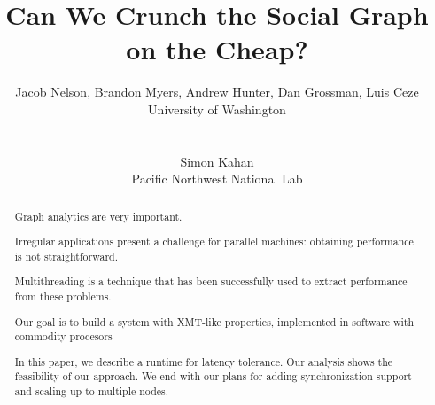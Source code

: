 \documentclass{acm_proc_article-sp}
\begin{document}
\title{Can We Crunch the Social Graph on the Cheap?}

\author{
Jacob Nelson, Brandon Myers, Andrew Hunter, Dan Grossman, Luis Ceze\\
University of Washington\\
\\ \\
Simon Kahan \\ 
Pacific Northwest National Lab\\
}

\maketitle
\begin{abstract}


Graph analytics are very important. 

Irregular applications present a challenge for parallel machines:
obtaining performance is not straightforward. 

Multithreading is a technique that has been successfully used to
extract performance from these problems.



Our goal is to build a system with XMT-like properties, implemented in
software with commodity procesors

In this paper, we describe a runtime for latency tolerance. Our
analysis shows the feasibility of our approach. We end with our plans
for adding synchronization support and scaling up to multiple nodes.







\end{abstract}
\end{document}
